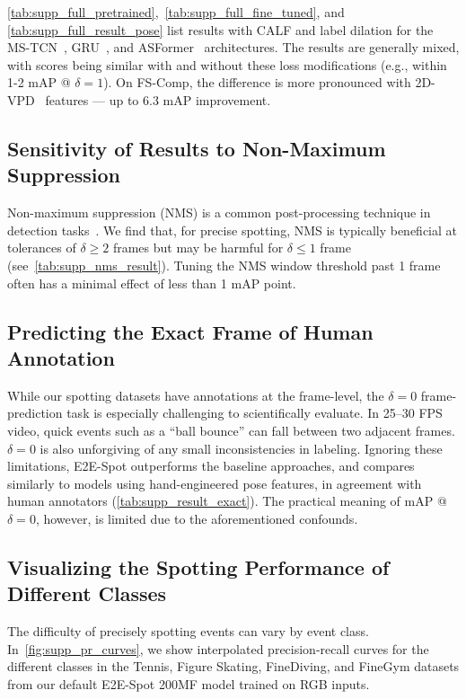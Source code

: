 \documentclass[runningheads]{llncs}
\newcommand{\notation}[1]{\ensuremath{#1}\xspace}
\newcommand{\OURMETHOD}{{E2E-Spot}\xspace}
\newcommand{\fscomp}{{FS-Comp}\xspace}
\newcommand{\finegym}{{FineGym}\xspace}
\newcommand{\finediving}{{FineDiving}\xspace}
\newcommand{\Tolerance}{\notation{\delta}}
\begin{document}
\autoref{tab:supp_full_pretrained},~\ref{tab:supp_full_fine_tuned}, and \ref{tab:supp_full_result_pose} list results with CALF and label dilation for the MS-TCN~\cite{mstcn}, GRU~\cite{gatedrnn}, and ASFormer~\cite{asformer} architectures.
The results are generally mixed, with scores being similar with and without these loss modifications (e.g., within 1-2 mAP @ $\Tolerance=1$).
On \fscomp, the difference is more pronounced with 2D-VPD~\cite{vpd} features --- up to 6.3 mAP improvement.

\subsection{Sensitivity of Results to Non-Maximum Suppression}
\label{sub:supp_ablate_nms}

Non-maximum suppression (NMS) is a common post-processing technique in detection tasks~\cite{soccernetv2,rcnn}.
We find that, for precise spotting, NMS is typically beneficial at tolerances of $\Tolerance\geq2$ frames but may be harmful for $\Tolerance \leq 1$ frame (see~\autoref{tab:supp_nms_result}).
Tuning the NMS window threshold past 1 frame often has a minimal effect of less than 1 mAP point.

\subsection{Predicting the Exact Frame of Human Annotation}
\label{sub:supp_result_exact}

While our spotting datasets have annotations at the frame-level, the $\Tolerance=0$ frame-prediction task is especially challenging to scientifically evaluate.
In 25--30 FPS video, quick events such as a ``ball bounce'' can fall between two adjacent frames.
$\Tolerance=0$ is also unforgiving of any small inconsistencies in labeling.
Ignoring these limitations, \OURMETHOD outperforms the baseline approaches, and compares similarly to models using hand-engineered pose features, in agreement with human annotators (\autoref{tab:supp_result_exact}).
The practical meaning of mAP @ $\Tolerance=0$, however, is limited due to the aforementioned confounds.

\subsection{Visualizing the Spotting Performance of Different Classes}
\label{sub:supp_breakdown_class}

The difficulty of precisely spotting events can vary by event class.
In~\autoref{fig:supp_pr_curves}, we show interpolated precision-recall curves for the different classes in the Tennis, Figure Skating, \finediving, and \finegym datasets from our default \OURMETHOD 200MF model trained on RGB inputs.
\end{document}
